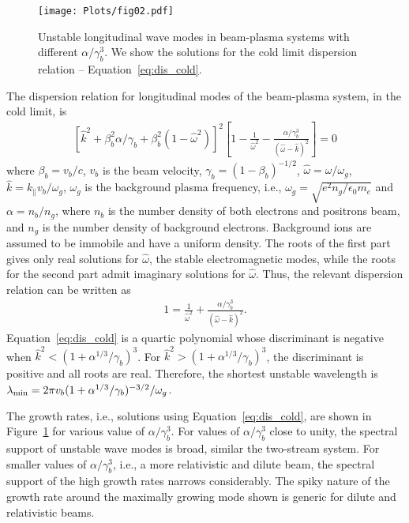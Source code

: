 \documentclass[pop,numberedappendix,iop]{aeb_emulateapj_2015}
\begin{document}
\begin{figure}
\center
\texttt{[image: Plots/fig02.pdf]}
\caption{
Unstable longitudinal wave modes in beam-plasma systems with different $\alpha/\gamma_b^3$. We show the solutions for the cold limit dispersion relation --  Equation~\eqref{eq:dis_cold}.
\label{fig:Beam-Plasma}
}
\end{figure}



The dispersion relation for longitudinal modes of the beam-plasma system, in the cold limit, is~\citep{fainberg+1969}
\begin{eqnarray}
\left[
 \hat{k}^2 +
\beta_b ^2 \alpha /  \gamma_b +
\beta_b ^2   \left( 1 - \hat{\omega }^2 \right)
\right]^2 
\left[
1-  \frac{1}{\hat{\omega }^2}
- \frac{\alpha /\gamma _b^3 }{  (\hat{\omega }-\hat{k} )^2}
\right]
=
0
\end{eqnarray}
where $\beta_b  = v_b/c$, $v_b$ is the beam velocity, $\gamma_b=(1-\beta_b)^{-1/2}$, $\hat{\omega}=\omega/\omega_g$, $\hat{k} = k_{\parallel}v_b/\omega_g$, $\omega_g $ is the background plasma frequency, i.e., $\omega_g = \sqrt{e^2 n_g/\epsilon_0 m_e}$ and $\alpha=n_b/n_g$, where $n_b$ is the number density of both electrons and positrons beam, and $n_g$ is the number density of background electrons. Background ions are assumed to be immobile and have a uniform density.
The roots of the first part gives only real solutions for $\hat{\omega}$, the stable electromagnetic modes,
while the roots for the second part admit imaginary solutions for $\hat{\omega}$. Thus, the relevant dispersion relation can be written as 
\begin{eqnarray}
1 = \frac{1}{\hat{\omega}^2} + \frac{\alpha/\gamma_b^3}{(\hat{\omega}-\hat{k})^2}.
\label{eq:dis_cold}
\end{eqnarray}
Equation~\eqref{eq:dis_cold} is a quartic polynomial whose discriminant is negative when $\hat{k}^2 < (1+\alpha^{1/3}/\gamma_b)^{3}$. 
For $\hat{k}^2 > (1+\alpha^{1/3}/\gamma_b)^{3} $, the discriminant is positive and all roots are real.
Therefore,
the shortest unstable wavelength is $\lambda_{\rm min} = 2 \pi v_b (1+\alpha^{1/3}/\gamma_b)^{-3/2} /\omega_g$.


The growth rates, i.e., solutions using Equation~\eqref{eq:dis_cold}, are shown in Figure~\ref{fig:Beam-Plasma} for various value of $\alpha/\gamma_b^3$.
For values of $\alpha/\gamma_b^3$ close to unity, the spectral support of unstable wave modes is broad, similar the two-stream system.
For smaller values of $\alpha/\gamma_b^3$, i.e., a more relativistic and dilute beam, the spectral support of the high growth rates narrows considerably.
The spiky nature of the growth rate around the maximally growing mode shown is generic for dilute and relativistic beams.
\end{document}
